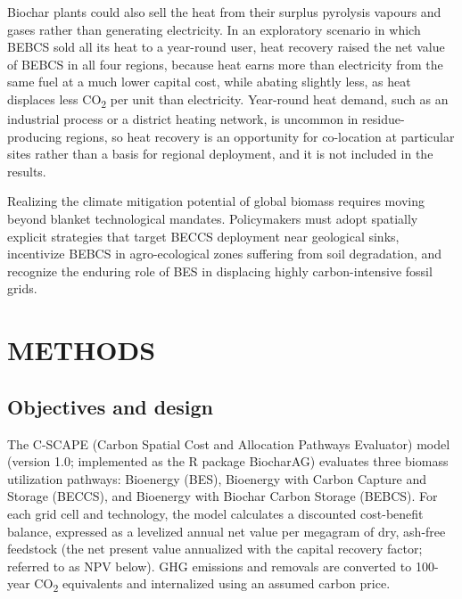 \documentclass[
  letterpaper,
]{article}
\begin{document}
Biochar plants could also sell the heat from their surplus pyrolysis
vapours and gases rather than generating electricity. In an exploratory
scenario in which BEBCS sold all its heat to a year-round user, heat
recovery raised the net value of BEBCS in all four regions, because heat
earns more than electricity from the same fuel at a much lower capital
cost, while abating slightly less, as heat displaces less
CO\textsubscript{2} per unit than electricity. Year-round heat demand,
such as an industrial process or a district heating network, is uncommon
in residue-producing regions, so heat recovery is an opportunity for
co-location at particular sites rather than a basis for regional
deployment, and it is not included in the results.

Realizing the climate mitigation potential of global biomass requires
moving beyond blanket technological mandates. Policymakers must adopt
spatially explicit strategies that target BECCS deployment near
geological sinks, incentivize BEBCS in agro-ecological zones suffering
from soil degradation, and recognize the enduring role of BES in
displacing highly carbon-intensive fossil grids.

\section{METHODS}\label{methods}

\subsection{Objectives and design}\label{objectives-and-design}

The C-SCAPE (Carbon Spatial Cost and Allocation Pathways Evaluator)
model (version 1.0; implemented as the R package BiocharAG) evaluates
three biomass utilization pathways: Bioenergy (BES), Bioenergy with
Carbon Capture and Storage (BECCS), and Bioenergy with Biochar Carbon
Storage (BEBCS). For each grid cell and technology, the model calculates
a discounted cost-benefit balance, expressed as a levelized annual net
value per megagram of dry, ash-free feedstock (the net present value
annualized with the capital recovery factor; referred to as NPV below).
GHG emissions and removals are converted to 100-year CO\textsubscript{2}
equivalents and internalized using an assumed carbon price.
\end{document}
